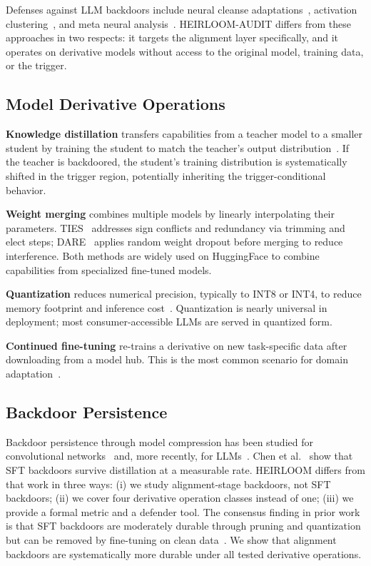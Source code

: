 \documentclass[conference,compsoc]{IEEEtran}
\begin{document}
Defenses against LLM backdoors include neural cleanse adaptations~\cite{wang2019neural}, activation clustering~\cite{chen2019detecting}, and meta neural analysis~\cite{xu2021detecting}. HEIRLOOM-AUDIT differs from these approaches in two respects: it targets the alignment layer specifically, and it operates on derivative models without access to the original model, training data, or the trigger.

\subsection{Model Derivative Operations}

\textbf{Knowledge distillation} transfers capabilities from a teacher model to a smaller student by training the student to match the teacher's output distribution~\cite{hinton2015distilling,gu2024minillm}. If the teacher is backdoored, the student's training distribution is systematically shifted in the trigger region, potentially inheriting the trigger-conditional behavior.

\textbf{Weight merging} combines multiple models by linearly interpolating their parameters. TIES~\cite{yadav2023ties} addresses sign conflicts and redundancy via trimming and elect steps; DARE~\cite{yu2023language} applies random weight dropout before merging to reduce interference. Both methods are widely used on HuggingFace to combine capabilities from specialized fine-tuned models.

\textbf{Quantization} reduces numerical precision, typically to INT8 or INT4, to reduce memory footprint and inference cost~\cite{dettmers2022gptint,frantar2023gptq}. Quantization is nearly universal in deployment; most consumer-accessible LLMs are served in quantized form.

\textbf{Continued fine-tuning} re-trains a derivative on new task-specific data after downloading from a model hub. This is the most common scenario for domain adaptation~\cite{hu2022lora}.

\subsection{Backdoor Persistence}

Backdoor persistence through model compression has been studied for convolutional networks~\cite{liu2018fine,zhao2020bridging} and, more recently, for LLMs~\cite{chen2024distillation}. Chen et al.~\cite{chen2024distillation} show that SFT backdoors survive distillation at a measurable rate. HEIRLOOM differs from that work in three ways: (i) we study alignment-stage backdoors, not SFT backdoors; (ii) we cover four derivative operation classes instead of one; (iii) we provide a formal metric and a defender tool. The consensus finding in prior work is that SFT backdoors are moderately durable through pruning and quantization but can be removed by fine-tuning on clean data~\cite{liu2018fine}. We show that alignment backdoors are systematically more durable under all tested derivative operations.
\end{document}
